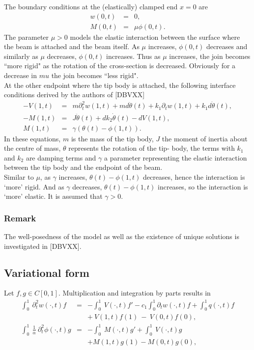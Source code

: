 \documentclass[../../main.tex]{subfiles}
\begin{document}
The boundary conditions at the (elastically) clamped end $x=0$ are
\begin{eqnarray}
   w(0,t) &=&  0, \label{CT_5}\\
   M(0,t) &=&  \mu \phi(0,t). \label{CT_6}
\end{eqnarray}
The parameter $\mu > 0$ models the elastic interaction between the surface where the beam is attached and the beam itself. As $\mu$ increases, $\phi(0,t)$ decreases and similarly as $\mu$ decreases, $\phi(0,t)$ increases. Thus as $\mu$ increases, the join becomes ``more rigid" as the rotation of the cross-section is decreased. Obviously for a decrease in $mu$ the join becomes ``less rigid".\\

At the other endpoint where the tip body is attached, the following interface conditions derived by the authors of [DBVXX]
\begin{eqnarray}
- V(1,t) &=& m \partial_t^2 w(1,t) + md \ddot \theta(t) + k_1 \partial_t w(1,t) + k_1 d \dot \theta(t), \label{CT_7}\\
 -M(1,t) &=& J \ddot \theta(t) + d k_2 \dot \theta(t)- dV(1,t), \label{CT_8}\\
M(1,t) &=& \gamma (\theta(t)- \phi(1,t)). \label{CT_9}
\end{eqnarray}
In these equations, $m$ is the mass of the tip body, $J$ the moment of inertia about the centre of mass, $\theta$ represents the rotation of the tip- body, the terms with $k_1$ and $k_2$ are damping terms and $\gamma$ a parameter representing the elastic interaction between the tip body and the endpoint of the beam.\\

Similar to $\mu$, as $\gamma$ increases, $\theta(t) - \phi(1,t)$ decreases, hence the interaction is `more' rigid. And as $\gamma$ decreases, $\theta(t) - \phi(1,t)$ increases, so the interaction is `more' elastic. It is assumed that $\gamma > 0$.

\subsubsection{Remark}
The well-posedness of the model as well as the existence of unique solutions is investigated in [DBVXX].


\subsection{Variational form}
Let $f,g \in C[0,1]$. Multiplication and integration by parts results in
\begin{eqnarray}
\int_0^1~ \partial^2_t w(\cdot,t) f &=&  - \int_0^1~ V(\cdot,t)f' - c_1\int_0^1 \partial_t w(\cdot,t)f + \int_0^1q(\cdot,t)f \nonumber \\
& &+~V(1,t)f(1)~-~V(0,t)f(0), \label{CT_10}\\
 \int_0^1~ \frac{1}{\alpha}~\partial^2_t \phi(\cdot,t) g  &=& -\int_0^1~M(\cdot,t)g' + \int_0^1~ V(\cdot,t)g \nonumber\\
& & + M(1,t)g(1) -  M(0,t)g(0), \label{CT_11}
\end{eqnarray}
\end{document}
